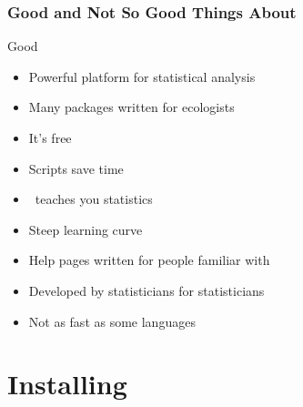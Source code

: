 \documentclass[color=usenames,dvipsnames]{beamer}\usepackage[]{graphicx}\usepackage[]{color}
\newcommand{\inr}[1]{\colorbox{inlinecolor}{\texttt{#1}}}
\begin{document}
\begin{frame}
  \frametitle{Good and Not So Good Things About \R}
  {\Large Good}
  \large
  \begin{itemize}%
    \item<1-> Powerful platform for statistical analysis %
    \item<1-> Many packages written for ecologists
    \item<1-> It's free
    \item<1-> Scripts save time
    \item<1-> \R~teaches you statistics
  \end{itemize}
  \vspace{0.5cm}
  \begin{itemize}
    \item<2-> Steep learning curve
    \item<2-> Help pages written for people familiar with \R
    \item<2-> Developed by statisticians for statisticians
    \item<2-> Not as fast as some languages
  \end{itemize}
\end{frame}








\section{Installing \R}
\end{document}
